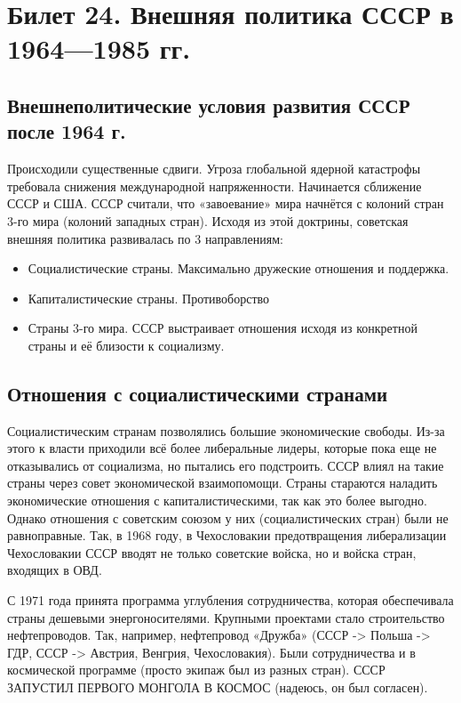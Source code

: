 \section{Билет 24. Внешняя политика СССР в 1964—1985 гг.}
    \subsection{Внешнеполитические условия развития СССР после 1964 г.}
    
    Происходили существенные сдвиги. Угроза глобальной ядерной катастрофы требовала снижения международной напряженности. Начинается сближение СССР и США. СССР считали, что «завоевание» мира начнётся с колоний стран 3-го мира (колоний западных стран). Исходя из этой доктрины, советская внешняя политика развивалась по 3 направлениям:
    
    \begin{itemize}
        \item Социалистические страны. Максимально дружеские отношения и поддержка.
        \item Капиталистические страны. Противоборство
        \item Страны 3-го мира. СССР выстраивает отношения исходя из конкретной страны и её близости к социализму.
    \end{itemize}

    \subsection{Отношения с социалистическими странами}
    
    Социалистическим странам позволялись большие экономические свободы. Из-за этого к власти приходили всё более либеральные лидеры, которые пока еще не отказывались от социализма, но пытались его подстроить. СССР влиял на такие страны через совет экономической взаимопомощи. Страны стараются наладить экономические отношения с капиталистическими, так как это более выгодно. Однако отношения с советским союзом у них (социалистических стран) были не равноправные. Так, в 1968 году, в Чехословакии предотвращения либерализации Чехословакии СССР вводят не только советские войска, но и войска стран, входящих в ОВД. 
    
    С 1971 года принята программа углубления сотрудничества, которая обеспечивала страны дешевыми энергоносителями. Крупными проектами стало строительство нефтепроводов. Так, например, нефтепровод «Дружба» (СССР -> Польша -> ГДР, СССР -> Австрия, Венгрия, Чехословакия). Были сотрудничества и в космической программе (просто экипаж был из разных стран). СССР ЗАПУСТИЛ ПЕРВОГО МОНГОЛА В КОСМОС (надеюсь, он был согласен).
    
